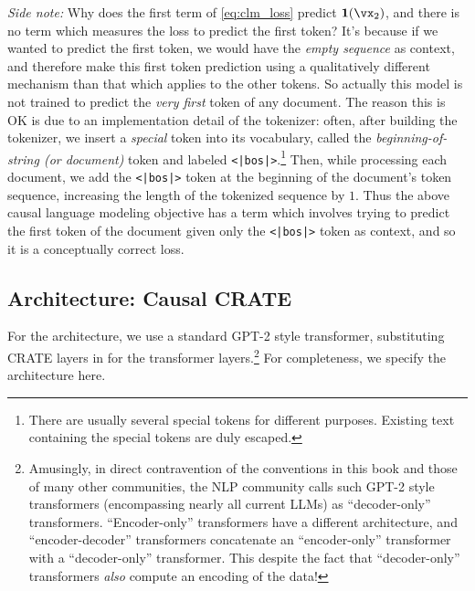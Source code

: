 \documentclass[../../book-main.tex]{subfiles}
\begin{document}
\textit{Side note:} Why does the first term of \eqref{eq:clm_loss} predict \(\vone(\vx_{2})\), and there is no term which measures the loss to predict the first token? It's because if we wanted to predict the first token, we would have the \textit{empty sequence} as context, and therefore make this first token prediction using a qualitatively different mechanism than that which applies to the other tokens. So actually this model is not trained to predict the \textit{very first} token of any document. The reason this is OK is due to an implementation detail of the tokenizer: often, after building the tokenizer, we insert a \textit{special} token into its vocabulary, called the \textit{beginning-of-string (or document)} token and labeled \texttt{<|bos|>}.\footnote{There are usually several special tokens for different purposes. Existing text containing the special tokens are duly escaped.} Then, while processing each document, we add the \texttt{<|bos|>} token at the beginning of the document's token sequence, increasing the length of the tokenized sequence by \(1\). Thus the above causal language modeling objective has a term which involves trying to predict the first token of the document given only the \texttt{<|bos|>} token as context, and so it is a conceptually correct loss.

\subsection{Architecture: Causal CRATE}

For the architecture, we use a standard GPT-2 style transformer, substituting CRATE layers in for the transformer layers.\footnote{Amusingly, in direct contravention of the conventions in this book and those of many other communities, the NLP community calls such GPT-2 style transformers (encompassing nearly all current LLMs) as ``decoder-only'' transformers. ``Encoder-only'' transformers have a different architecture, and ``encoder-decoder'' transformers concatenate an ``encoder-only'' transformer with a ``decoder-only'' transformer. This despite the fact that ``decoder-only'' transformers \textit{also} compute an encoding of the data!} For completeness, we specify the architecture here.
\end{document}
